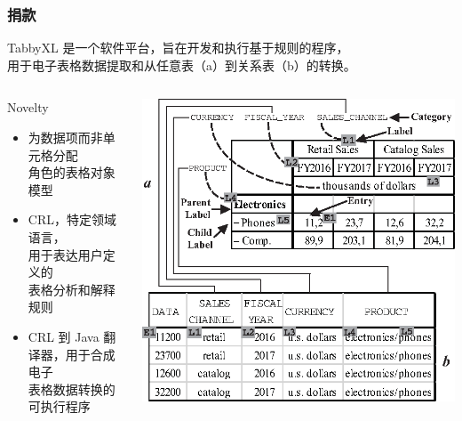 \documentclass[10pt]{beamer}
\begin{document}
\begin{frame}
\frametitle{捐款}
\small TabbyXL 是一个软件平台，旨在开发和执行基于规则的程序，\\
用于电子表格数据提取和从任意表（a）到关系表（b）的转换。
\vspace{1em}
\begin{columns}[c] %
\begin{block}{\small Novelty}
\begin{itemize}
\item \small 为数据项而非单元格分配\\角色的表格对象模型
\item \small CRL，特定领域语言，\\ 用于表达用户定义的\\表格分析和解释规则
\item \small CRL 到 Java 翻译器，用于合成电子\\
  表格数据转换的\\可执行程序
\end{itemize}
\end{block}
\includegraphics[width=0.85\linewidth]{intro}
\end{columns}
\end{frame}
\end{document}
